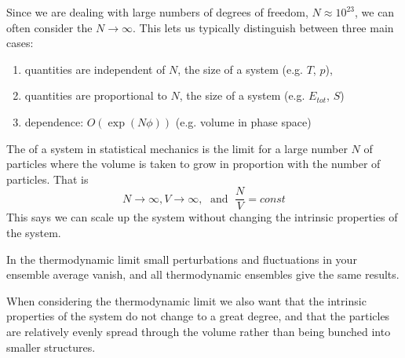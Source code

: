 \documentclass[12pt, a4paper, oneside, openright, titlepage]{book}
\begin{document}
Since we are dealing with large numbers of degrees of freedom, $N \approx 10^{23}$, we can often consider the  $N\rightarrow \infty$. This lets us typically distinguish between three main cases: \begin{enumerate}
    \item {} quantities are independent of $N$, the size of a system (e.g. $T$, $p$),
    \item {} quantities are proportional to $N$, the size of a system (e.g. $E_{tot}$, $S$)
    \item {} dependence: $O(\exp(N\phi))$ (e.g. volume in phase space)
\end{enumerate}

\begin{defn}
    The  of a system in statistical mechanics is the limit for a large number $N$ of particles where the volume is taken to grow in proportion with the number of particles. That is \begin{equation*}
        N\rightarrow \infty, V\rightarrow \infty,\;\text{ and }\;\frac{N}{V} = const
    \end{equation*}
    This says we can scale up the system without changing the intrinsic properties of the system.
\end{defn}

\begin{rmk}
    In the thermodynamic limit small perturbations and fluctuations in your ensemble average vanish, and all thermodynamic ensembles give the same results.
\end{rmk}

When considering the thermodynamic limit we also want that the intrinsic properties of the system do not change to a great degree, and that the particles are relatively evenly spread through the volume rather than being bunched into smaller structures.
\end{document}
